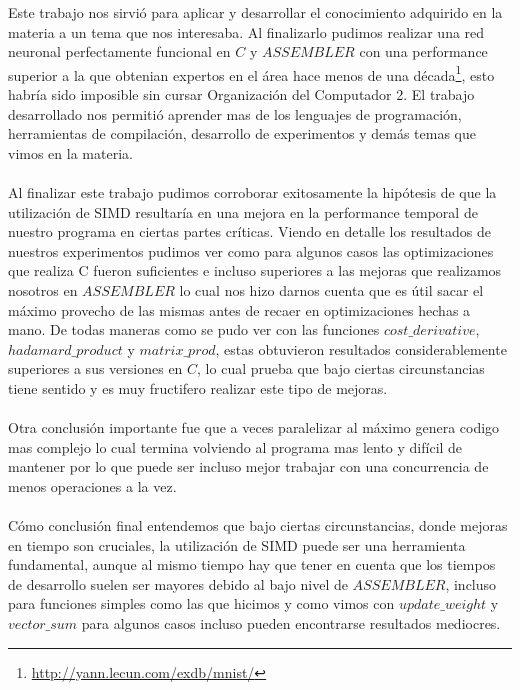 
Este trabajo nos sirvió para aplicar y desarrollar el conocimiento adquirido en la materia a un tema que nos interesaba. Al finalizarlo pudimos realizar una red neuronal perfectamente funcional en $C$ y $ASSEMBLER$ con una performance superior a la que obtenian expertos en el área hace menos de una década\footnote{\url{http://yann.lecun.com/exdb/mnist/}}, esto habría sido imposible sin cursar Organización del Computador 2. El trabajo desarrollado nos permitió aprender mas de los lenguajes de programación, herramientas de compilación, desarrollo de experimentos y demás temas que vimos en la materia.
\\
\\
Al finalizar este trabajo pudimos corroborar exitosamente la hipótesis de que la utilización de SIMD resultaría en una mejora en la performance temporal de nuestro programa en ciertas partes críticas. Viendo en detalle los resultados de nuestros experimentos pudimos ver como para algunos casos las optimizaciones que realiza C fueron suficientes e incluso superiores a las mejoras que realizamos nosotros en $ASSEMBLER$ lo cual nos hizo darnos cuenta que es útil sacar el máximo provecho de las mismas antes de recaer en optimizaciones hechas a mano. De todas maneras como se pudo ver con las funciones $cost\_derivative$, $hadamard\_product$ y $matrix\_prod$, estas obtuvieron resultados considerablemente superiores a sus versiones en $C$, lo cual prueba que bajo ciertas circunstancias tiene sentido y es muy fructifero realizar este tipo de mejoras.
\\
\\
Otra conclusión importante fue que a veces paralelizar al máximo genera codigo mas complejo lo cual termina volviendo al programa mas lento y difícil de mantener por lo que puede ser incluso mejor trabajar con una concurrencia de menos operaciones a la vez.
\\
\\
Cómo conclusión final entendemos que bajo ciertas circunstancias, donde mejoras en tiempo son cruciales, la utilización de SIMD puede ser una herramienta fundamental, aunque al mismo tiempo hay que tener en cuenta que los tiempos de desarrollo suelen ser mayores debido al bajo nivel de $ASSEMBLER$, incluso para funciones simples como las que hicimos y como vimos con $update\_weight$ y $vector\_sum$ para algunos casos incluso pueden encontrarse resultados mediocres.